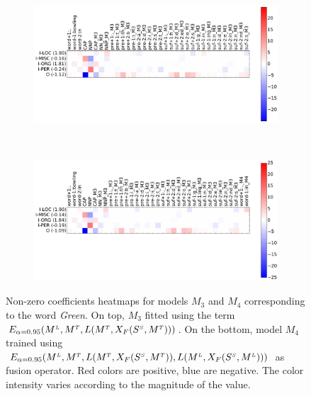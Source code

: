 \begin{figure}[h!]
	\centering
	\begin{subfigure}[t]{.9\textwidth}
	\centering
	\captionsetup{width=\textwidth}
	\includegraphics[width=1\linewidth]{images/Chapitre4/M3_16029.pdf}
	\label{fig:trans_M33}
	\end{subfigure}\\%
	\begin{subfigure}[t]{.9\textwidth}
	\centering
	\captionsetup{width=\textwidth}	
	\includegraphics[width=1\linewidth]{images/Chapitre4/M4_16029.pdf}
	\label{fig:trans_M4}
	\end{subfigure}
	\caption{Non-zero coefficients heatmaps for  models $M_3$ and $M_4$ corresponding to the word \textit{Green}. On top, $M_3$ fitted using the term $E_{\alpha=0.95}(M^{\scriptscriptstyle L}, M^{\scriptscriptstyle T}, L(M^{\scriptscriptstyle T}, X_F(S^{\scriptscriptstyle S}, M^{\scriptscriptstyle T})))$. On the bottom, model $M_4$ trained using   $E_{\alpha=0.95}(M^{\scriptscriptstyle L}, M^{\scriptscriptstyle T}, L(M^{\scriptscriptstyle T}, X_F(S^{\scriptscriptstyle S}, M^{\scriptscriptstyle T})), L(M^{\scriptscriptstyle L}, X_F(S^{\scriptscriptstyle S}, M^{\scriptscriptstyle L})))$ as fusion operator. Red colors are positive, blue are negative. The color intensity varies according to the magnitude of the value.}
	\label{fig:trans_M3_M4}
\end{figure}

